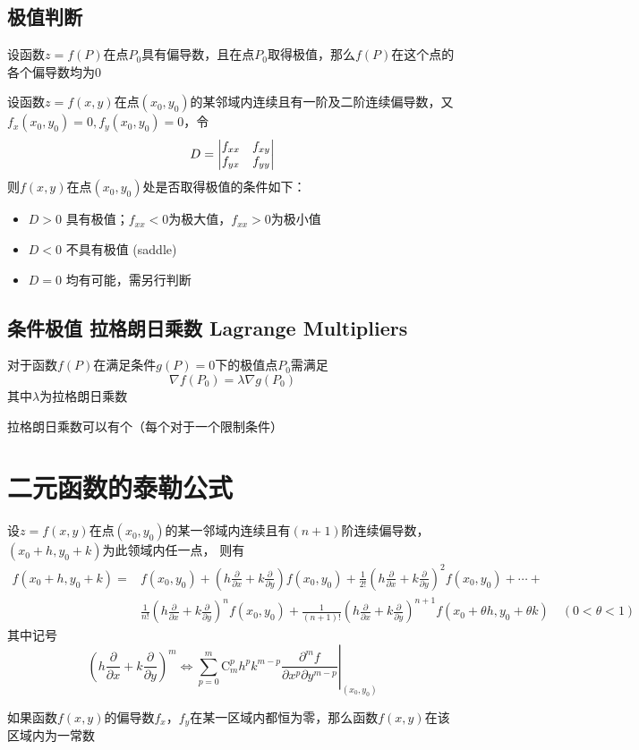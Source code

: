 \documentclass[UTF8]{ctexart}
\newcommand{\when}[2]{{\left.{#1}\right|_{#2}}}
\begin{document}
\subsection*{极值判断}
设函数$z=f(P)$在点$P_0$具有偏导数，且在点$P_0$取得极值，那么$f(P)$在这个点的各个偏导数均为$0$

\bigskip

设函数$z=f(x,y)$在点$(x_0,y_0)$的某邻域内连续且有一阶及二阶连续偏导数，又$f_x(x_0,y_0)=0,f_y(x_0,y_0)=0$，令
\[D={\renewcommand{\arraystretch}{1}\begin{vmatrix}f_{xx}&f_{xy}\\f_{yx}&f_{yy}\end{vmatrix}}\]
则$f(x,y)$在点$(x_0,y_0)$处是否取得极值的条件如下：
\begin{itemize}
  \item $D>0$ 具有极值；$f_{xx}<0$为极大值，$f_{xx}>0$为极小值
  \item $D<0$ 不具有极值 (saddle)
  \item $D=0$ 均有可能，需另行判断
\end{itemize}


\subsection*{条件极值 拉格朗日乘数 Lagrange Multipliers}
对于函数$f(P)$在满足条件$g(P)=0$下的极值点$P_0$需满足
\[\nabla f(P_0)=\lambda\nabla g(P_0)\]
其中$\lambda$为拉格朗日乘数

拉格朗日乘数可以有个（每个对于一个限制条件）
\bigskip
\bigskip

\section*{二元函数的泰勒公式}

\bigskip
设$z=f(x,y)$在点$(x_0,y_0)$的某一邻域内连续且有$(n+1)$阶连续偏导数，$(x_0+h,y_0+k)$为此领域内任一点，
则有
\[
\begin{aligned}
  f(x_0+h,y_0+k)
  =&f(x_0,y_0)+
  \left(h\frac{\partial}{\partial x}+k\frac{\partial}{\partial y}\right)f(x_0,y_0)+
  \frac{1}{2!}{\left(h\frac{\partial}{\partial x}+k\frac{\partial}{\partial y}\right)}^2f(x_0,y_0)+\cdots+\\
  &\frac{1}{n!}{\left(h\frac{\partial}{\partial x}+k\frac{\partial}{\partial y}\right)}^nf(x_0,y_0)+
  \frac{1}{(n+1)!}{\left(h\frac{\partial}{\partial x}+k\frac{\partial}{\partial y}\right)}^{n+1}f(x_0+\theta h,y_0+\theta k)\quad(0<\theta<1)
\end{aligned}
\]
其中记号
\[
{\left(h\frac{\partial}{\partial x}+k\frac{\partial}{\partial y}\right)}^m
\Leftrightarrow
\when{\sum^m_{p=0}\text{C}_m^ph^pk^{m-p}\frac{\partial^m f}{\partial x^p \partial y^{m-p}}}{(x_0,y_0)}
\]

\bigskip

如果函数$f(x,y)$的偏导数$f_x$，$f_y$在某一区域内都恒为零，那么函数$f(x,y)$在该区域内为一常数
\end{document}
